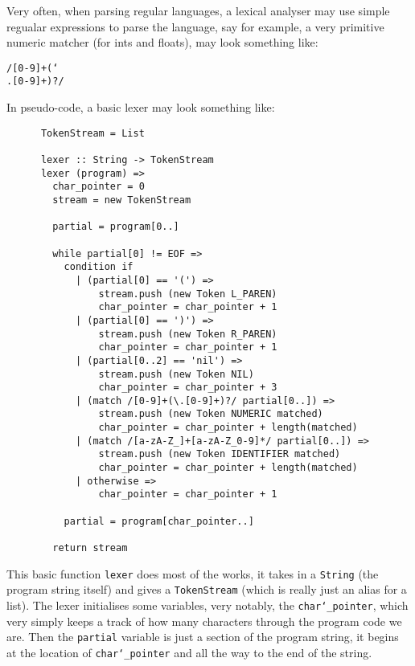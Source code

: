 \documentclass{article}
\newcommand{\code}[1]{\texttt{#1}}
\begin{document}
      \clearpage

      Very often, when parsing regular languages, a lexical analyser may use
      simple regualar expressions to parse the language, say for example, a
      very primitive numeric matcher (for ints and floats), may look something
      like:

      \centerline{\code{/[0-9]+(\char`\\.[0-9]+)?/}}

      In pseudo-code, a basic lexer may look something like:

      \begin{verbatim}
      TokenStream = List

      lexer :: String -> TokenStream
      lexer (program) =>
        char_pointer = 0
        stream = new TokenStream

        partial = program[0..]

        while partial[0] != EOF =>
          condition if
            | (partial[0] == '(') =>
                stream.push (new Token L_PAREN)
                char_pointer = char_pointer + 1
            | (partial[0] == ')') =>
                stream.push (new Token R_PAREN)
                char_pointer = char_pointer + 1
            | (partial[0..2] == 'nil') =>
                stream.push (new Token NIL)
                char_pointer = char_pointer + 3
            | (match /[0-9]+(\.[0-9]+)?/ partial[0..]) =>
                stream.push (new Token NUMERIC matched)
                char_pointer = char_pointer + length(matched)
            | (match /[a-zA-Z_]+[a-zA-Z_0-9]*/ partial[0..]) =>
                stream.push (new Token IDENTIFIER matched)
                char_pointer = char_pointer + length(matched)
            | otherwise =>
                char_pointer = char_pointer + 1

          partial = program[char_pointer..]

        return stream
      \end{verbatim}


      This basic function \code{lexer} does most of the works, it takes in a
      \code{String} (the program string itself) and gives a \code{TokenStream}
      (which is really just an alias for a list). The lexer initialises some
      variables, very notably, the \code{char\char`_pointer}, which very simply keeps
      a track of how many characters through the program code we are. Then the
      \code{partial} variable is just a section of the program string, it begins
      at the location of \code{char\char`_pointer} and all the way to the end
      of the string.\\
\end{document}
